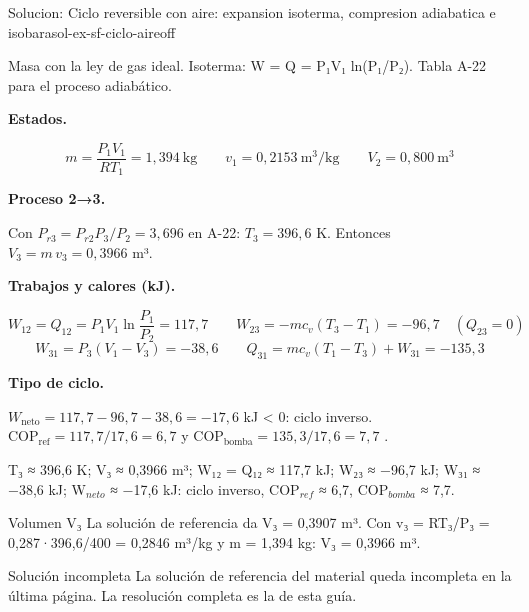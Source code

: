 \documentclass[11pt,a4paper]{article}
\begin{document}
\begin{ocg}{Solucion: Ciclo reversible con aire: expansion isoterma, compresion adiabatica e isobara}{sol-ex-sf-ciclo-aire}{off}
\begin{antesbox}
Masa con la ley de gas ideal. Isoterma: W = Q = P₁V₁ ln(P₁/P₂). Tabla A-22 para el proceso adiabático.
\end{antesbox}

\par\medskip\noindent\textbf{Estados.}\par
\[m = \frac{P_1V_1}{RT_1} = 1{,}394\ \text{kg} \qquad v_1 = 0{,}2153\ \text{m}^3/\text{kg} \qquad V_2 = 0{,}800\ \text{m}^3\]

\par\medskip\noindent\textbf{Proceso 2→3.}\par
Con  $P_{r3} = P_{r2}P_3/P_2 = 3{,}696$  en A-22:  $T_3 = 396{,}6$  K. Entonces  $V_3 = m\,v_3 = 0{,}3966$  m³.

\par\medskip\noindent\textbf{Trabajos y calores (kJ).}\par
\[W_{12} = Q_{12} = P_1V_1\ln\frac{P_1}{P_2} = 117{,}7 \qquad W_{23} = -m c_v(T_3 - T_1) = -96{,}7 \quad (Q_{23} = 0)\]   \[W_{31} = P_3(V_1 - V_3) = -38{,}6 \qquad Q_{31} = m c_v(T_1 - T_3) + W_{31} = -135{,}3\]

\par\medskip\noindent\textbf{Tipo de ciclo.}\par
$W_{\text{neto}} = 117{,}7 - 96{,}7 - 38{,}6 = -17{,}6$  kJ < 0: ciclo inverso.  $\mathrm{COP}_{\text{ref}} = 117{,}7/17{,}6 = 6{,}7$  y  $\mathrm{COP}_{\text{bomba}} = 135{,}3/17{,}6 = 7{,}7$ .

\begin{resbox}
T₃ ≈ 396,6 K; V₃ ≈ 0,3966 m³; W₁₂ = Q₁₂ ≈ 117,7 kJ; W₂₃ ≈ −96,7 kJ; W₃₁ ≈ −38,6 kJ; W$_{neto}$ ≈ −17,6 kJ: ciclo inverso, COP$_{ref}$ ≈ 6,7, COP$_{bomba}$ ≈ 7,7.
\end{resbox}

\begin{ojobox}{Volumen V₃}
La solución de referencia da V₃ = 0,3907 m³. Con v₃ = RT₃/P₃ = 0,287·396,6/400 = 0,2846 m³/kg y m = 1,394 kg: V₃ = 0,3966 m³.
\end{ojobox}

\begin{ojobox}{Solución incompleta}
La solución de referencia del material queda incompleta en la última página. La resolución completa es la de esta guía.
\end{ojobox}

\hspace{0pt}\end{ocg}
\end{document}
